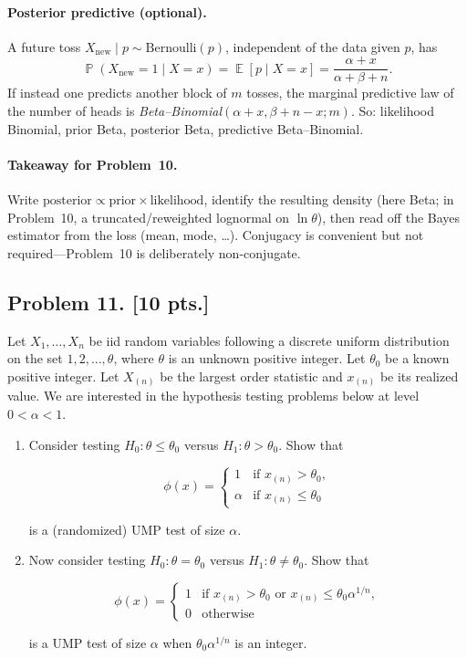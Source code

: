 \documentclass[11pt,a4paper]{article}
\DeclareMathOperator{\E}{\mathbb{E}}
\DeclareMathOperator{\Pbb}{\mathbb{P}}
\begin{document}
\begin{examnote}
\paragraph{Posterior predictive (optional).}
A future toss \(X_{\mathrm{new}}\mid p\sim\mathrm{Bernoulli}(p)\), independent of the data given \(p\), has
\[
\Pbb(X_{\mathrm{new}}=1\mid X=x)
=
\E[p\mid X=x]
=
\frac{\alpha+x}{\alpha+\beta+n}.
\]
If instead one predicts another block of \(m\) tosses, the marginal predictive law of the number of heads is \emph{Beta--Binomial}\((\alpha+x,\beta+n-x;m)\). So: likelihood Binomial, prior Beta, posterior Beta, predictive Beta--Binomial.

\paragraph{Takeaway for Problem~10.}
Write \(\text{posterior}\propto\text{prior}\times\text{likelihood}\), identify the resulting density (here Beta; in Problem~10, a truncated/reweighted lognormal on \(\ln\theta\)), then read off the Bayes estimator from the loss (mean, mode, \ldots). Conjugacy is convenient but not required---Problem~10 is deliberately non-conjugate.
\end{examnote}

\subsection{Problem 11. [10 pts.]}
Let \( X_1, \dots, X_n \) be iid random variables following a discrete uniform distribution on the set \( 1, 2, \dots, \theta \), where \( \theta \) is an unknown positive integer. Let \( \theta_0 \) be a known positive integer. Let \( X_{(n)} \) be the largest order statistic and \( x_{(n)} \) be its realized value. We are interested in the hypothesis testing problems below at level \( 0 < \alpha < 1 \).
\begin{enumerate}[label=(\alph*)]
    \item Consider testing \( H_0 : \theta \le \theta_0 \) versus \( H_1 : \theta > \theta_0 \). Show that

    \[
    \phi(x) =
    \begin{cases}
    1 & \text{if } x_{(n)} > \theta_0, \\
    \alpha & \text{if } x_{(n)} \le \theta_0
    \end{cases}
    \]

    is a (randomized) UMP test of size \( \alpha \).
    \item Now consider testing \( H_0 : \theta = \theta_0 \) versus \( H_1 : \theta \neq \theta_0 \). Show that

    \[
    \phi(x) =
    \begin{cases}
    1 & \text{if } x_{(n)} > \theta_0 \text{ or } x_{(n)} \le \theta_0 \alpha^{1/n}, \\
    0 & \text{otherwise}
    \end{cases}
    \]

    is a UMP test of size \( \alpha \) when \( \theta_0 \alpha^{1/n} \) is an integer.
\end{enumerate}
\end{document}
